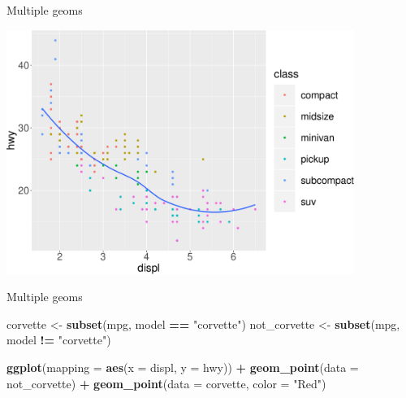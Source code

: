 \documentclass[ignorenonframetext,]{beamer}
\newenvironment{Shaded}{\begin{snugshade}}{\end{snugshade}}
\newcommand{\DataTypeTok}[1]{\textcolor[rgb]{0.13,0.29,0.53}{#1}}
\newcommand{\KeywordTok}[1]{\textcolor[rgb]{0.13,0.29,0.53}{\textbf{#1}}}
\newcommand{\NormalTok}[1]{#1}
\newcommand{\OperatorTok}[1]{\textcolor[rgb]{0.81,0.36,0.00}{\textbf{#1}}}
\newcommand{\StringTok}[1]{\textcolor[rgb]{0.31,0.60,0.02}{#1}}
\begin{document}
\begin{frame}{Multiple geoms}
\protect\hypertarget{multiple-geoms-32}{}

\begin{center}\includegraphics[height=300px]{data-visualization_files/figure-beamer/unnamed-chunk-109-1} \end{center}

\end{frame}

\begin{frame}[fragile]{Multiple geoms}
\protect\hypertarget{multiple-geoms-33}{}

\begin{Shaded}
\begin{Highlighting}[]
\NormalTok{corvette <-}\StringTok{ }\KeywordTok{subset}\NormalTok{(mpg, model }\OperatorTok{==}\StringTok{ "corvette"}\NormalTok{)}
\NormalTok{not_corvette <-}\StringTok{ }\KeywordTok{subset}\NormalTok{(mpg, model }\OperatorTok{!=}\StringTok{ "corvette"}\NormalTok{)}

\KeywordTok{ggplot}\NormalTok{(}\DataTypeTok{mapping =} \KeywordTok{aes}\NormalTok{(}\DataTypeTok{x =}\NormalTok{ displ, }\DataTypeTok{y =}\NormalTok{ hwy)) }\OperatorTok{+}\StringTok{ }
\StringTok{  }\KeywordTok{geom_point}\NormalTok{(}\DataTypeTok{data =}\NormalTok{ not_corvette) }\OperatorTok{+}\StringTok{ }
\StringTok{  }\KeywordTok{geom_point}\NormalTok{(}\DataTypeTok{data =}\NormalTok{ corvette,  }\DataTypeTok{color =} \StringTok{"Red"}\NormalTok{)}
\end{Highlighting}
\end{Shaded}

\end{frame}
\end{document}
